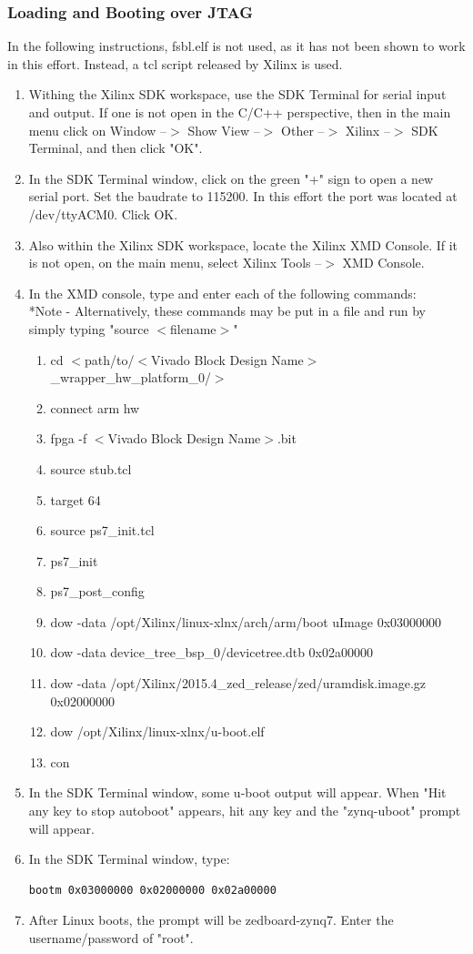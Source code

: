 \documentclass[12pt]{article}
\begin{document}
\subsubsection{Loading and Booting over JTAG}
In the following instructions, fsbl.elf is not used, as it has not been shown to work in this effort.  Instead, a tcl script released by Xilinx is used.
\begin{enumerate}
\item Withing the Xilinx SDK workspace, use the SDK Terminal for serial input and output.  If one is not open in the C/C++ perspective, then in the main menu click on Window --$>$ Show View --$>$ Other --$>$ Xilinx --$>$ SDK Terminal, and then click "OK".
\item In the SDK Terminal window, click on the green "+" sign to open a new serial port.  Set the baudrate to 115200.  In this effort the port was located at /dev/ttyACM0.  Click OK.
\item Also within the Xilinx SDK workspace, locate the Xilinx XMD Console.  If it is not open, on the main menu, select Xilinx Tools --$>$ XMD Console.
\item In the XMD console, type and enter each of the following commands:
\\ *Note - Alternatively, these commands may be put in a file and run by simply typing "source $<$filename$>$"
\begin{enumerate}
\item cd $<$path/to/$<$Vivado Block Design Name$>$\_wrapper\_hw\_platform\_0/$>$
\item connect arm hw
\item fpga -f $<$Vivado Block Design Name$>$.bit
\item source stub.tcl
\item target 64
\item source ps7\_init.tcl
\item ps7\_init
\item ps7\_post\_config
\item dow -data /opt/Xilinx/linux-xlnx/arch/arm/boot uImage 0x03000000
\item dow -data device\_tree\_bsp\_0/devicetree.dtb 0x02a00000
\item dow -data /opt/Xilinx/2015.4\_zed\_release/zed/uramdisk.image.gz 0x02000000
\item dow /opt/Xilinx/linux-xlnx/u-boot.elf
\item con
\end{enumerate}
\item In the SDK Terminal window, some u-boot output will appear.  When "Hit any key to stop autoboot" appears, hit any key and the "zynq-uboot" prompt will appear.
\item In the SDK Terminal window, type:
\begin{lstlisting}
bootm 0x03000000 0x02000000 0x02a00000
\end{lstlisting}
\item After Linux boots, the prompt will be zedboard-zynq7.  Enter the username/password of "root".
\end{enumerate}
\end{document}

